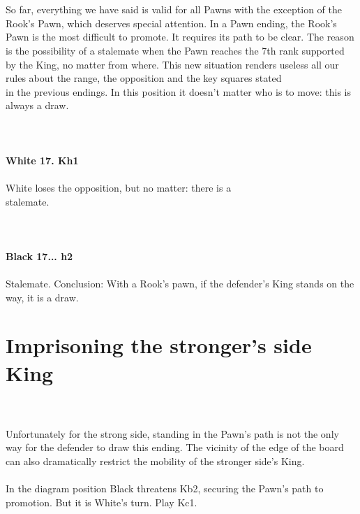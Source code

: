 \documentclass{article}
\begin{document}

\\
\\
So far, everything we have said is valid for all Pawns with the exception of the Rook's Pawn, which deserves special attention. In a Pawn ending, the Rook's Pawn is the most difficult to promote. It requires its path to be clear. The reason is the possibility of a stalemate when the Pawn reaches the 7th rank supported by the King, no matter from where. This new situation renders useless all our rules about the range, the opposition and the key squares stated\\in the previous endings. In this position it doesn't matter who is to move: this is always a draw.\\
\\

\\
\\
\textbf{White 17. Kh1}\\
\\
White loses the opposition, but no matter: there is a\\stalemate.\\
\\

\\
\\
\textbf{Black 17... h2}\\
\\
Stalemate. Conclusion: With a Rook's pawn, if the defender's King stands on the way, it is a draw.\section{ Imprisoning the stronger's side King}

\\
\\
Unfortunately for the strong side, standing in the Pawn's path is not the only way for the defender to draw this ending. The vicinity of the edge of the board can also dramatically restrict the mobility of the stronger side's King.\\\\In the diagram position Black threatens Kb2, securing the Pawn's path to promotion. But it is White's turn. Play Kc1.\\\\
\end{document}
